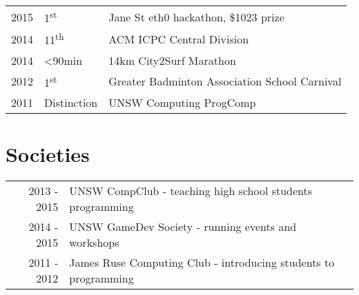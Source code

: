 \documentclass[letter]{deedy-resume} %
\begin{document}
\begin{minipage}[t]{0.66\textwidth}
\begin{tabular}{rll}
2015 & 1\textsuperscript{st} & Jane St eth0 hackathon, \$1023 prize \\
2014 & 11\textsuperscript{th} & ACM ICPC Central Division \\
2014 & <90min & 14km City2Surf Marathon \\
2012 & 1\textsuperscript{st} & Greater Badminton Association School Carnival \\
2011 & Distinction & UNSW Computing ProgComp \\
\end{tabular}

\sectionspace %


\section{Societies} 

\begin{tabular}{rll}
2013 - 2015 & UNSW CompClub - teaching high school students programming \\
2014 - 2015 & UNSW GameDev Society - running events and workshops \\
2011 - 2012 & James Ruse Computing Club - introducing students to programming \\
\end{tabular}

\sectionspace %


\end{minipage} %




\end{document}
